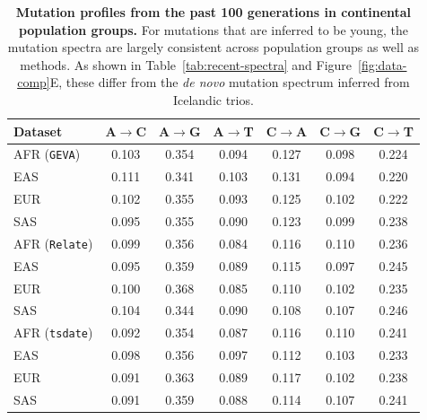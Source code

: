 \documentclass[]{article}
\newcommand{\GEVA}{\texttt{GEVA}\xspace}
\newcommand{\tsdate}{\texttt{tsdate}\xspace}
\newcommand{\relate}{\texttt{Relate}\xspace}
\begin{document}
\begin{table}[h]
    \centering
    \begin{tabular}[t]{l|cccccc}
        \toprule
        Dataset & A$\rightarrow$C & A$\rightarrow$G & A$\rightarrow$T &
            C$\rightarrow$A & C$\rightarrow$G & C$\rightarrow$T \\
        \midrule
        AFR (\GEVA) & 0.103 & 0.354 & 0.094 & 0.127 & 0.098 & 0.224 \\
        EAS & 0.111 & 0.341 & 0.103 & 0.131 & 0.094 & 0.220 \\
        EUR & 0.102 & 0.355 & 0.093 & 0.125 & 0.102 & 0.222 \\
        SAS & 0.095 & 0.355 & 0.090 & 0.123 & 0.099 & 0.238 \\
        \midrule
        AFR (\relate) & 0.099 & 0.356 & 0.084 & 0.116 & 0.110 & 0.236 \\
        EAS & 0.095 & 0.359 & 0.089 & 0.115 & 0.097 & 0.245 \\
        EUR & 0.100 & 0.368 & 0.085 & 0.110 & 0.102 & 0.235 \\
        SAS & 0.104 & 0.344 & 0.090 & 0.108 & 0.107 & 0.246 \\
        \midrule
        AFR (\tsdate) & 0.092 & 0.354 & 0.087 & 0.116 & 0.110 & 0.241 \\
        EAS & 0.098 & 0.356 & 0.097 & 0.112 & 0.103 & 0.233 \\
        EUR & 0.091 & 0.363 & 0.089 & 0.117 & 0.102 & 0.238 \\
        SAS & 0.091 & 0.359 & 0.088 & 0.114 & 0.107 & 0.241 \\
        \bottomrule
    \end{tabular}
    \caption{
        \label{tab:population-spectra}
        \textbf{Mutation profiles from the past 100 generations in continental
        population groups.}
        For mutations that are inferred to be young,
        the mutation spectra are largely consistent across population groups
        as well as methods.
        As shown in Table~\ref{tab:recent-spectra} and Figure~\ref{fig:data-comp}E,
        these differ from the \emph{de novo}  mutation spectrum inferred from 
        Icelandic trios.
    }
\end{table}

\clearpage
\end{document}
